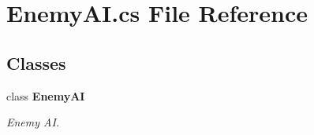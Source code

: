 \section{Enemy\+A\+I.\+cs File Reference}
\label{_enemy_a_i_8cs}
\subsection*{Classes}
\begin{DoxyCompactItemize}
\item 
class {\bf Enemy\+AI}
\begin{DoxyCompactList}\small\item\em Enemy AI. \end{DoxyCompactList}\end{DoxyCompactItemize}

